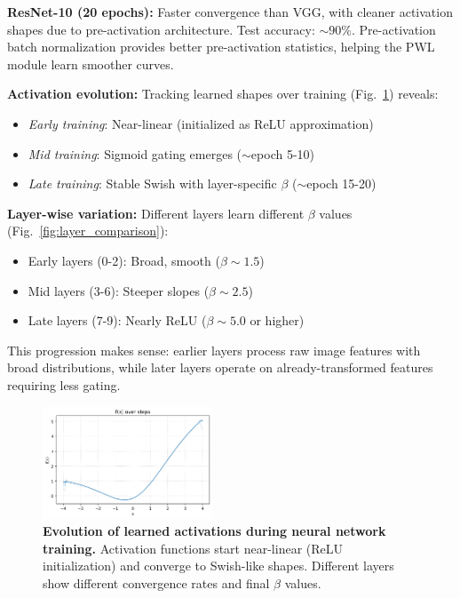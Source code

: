 \documentclass{article}
\begin{document}
\textbf{ResNet-10 (20 epochs):} Faster convergence than VGG, with cleaner activation shapes due to pre-activation architecture. Test accuracy: $\sim 90\%$. Pre-activation batch normalization provides better pre-activation statistics, helping the PWL module learn smoother curves.

\textbf{Activation evolution:} Tracking learned shapes over training (Fig.~\ref{fig:nn_evolution}) reveals:
\begin{itemize}
\item \textit{Early training}: Near-linear (initialized as ReLU approximation)
\item \textit{Mid training}: Sigmoid gating emerges ($\sim$epoch 5-10)
\item \textit{Late training}: Stable Swish with layer-specific $\beta$ ($\sim$epoch 15-20)
\end{itemize}

\textbf{Layer-wise variation:} Different layers learn different $\beta$ values (Fig.~\ref{fig:layer_comparison}):
\begin{itemize}
\item Early layers (0-2): Broad, smooth ($\beta \sim 1.5$)
\item Mid layers (3-6): Steeper slopes ($\beta \sim 2.5$)
\item Late layers (7-9): Nearly ReLU ($\beta \sim 5.0$ or higher)
\end{itemize}

This progression makes sense: earlier layers process raw image features with broad distributions, while later layers operate on already-transformed features requiring less gating.

\begin{figure}[t]
\centering
\includegraphics[width=0.45\textwidth]{figures/fig7.png}
\caption{\textbf{Evolution of learned activations during neural network training.} Activation functions start near-linear (ReLU initialization) and converge to Swish-like shapes. Different layers show different convergence rates and final $\beta$ values.}
\label{fig:nn_evolution}
\end{figure}
\end{document}
